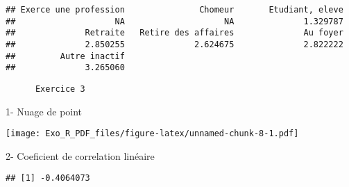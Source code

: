 \documentclass[
]{article}
\newenvironment{Shaded}{\begin{snugshade}}{\end{snugshade}}
\newcommand{\AttributeTok}[1]{\textcolor[rgb]{0.77,0.63,0.00}{#1}}
\newcommand{\CommentTok}[1]{\textcolor[rgb]{0.56,0.35,0.01}{\textit{#1}}}
\newcommand{\FunctionTok}[1]{\textcolor[rgb]{0.00,0.00,0.00}{#1}}
\newcommand{\NormalTok}[1]{#1}
\newcommand{\OtherTok}[1]{\textcolor[rgb]{0.56,0.35,0.01}{#1}}
\newcommand{\SpecialCharTok}[1]{\textcolor[rgb]{0.00,0.00,0.00}{#1}}
\newcommand{\StringTok}[1]{\textcolor[rgb]{0.31,0.60,0.02}{#1}}
\begin{document}
\begin{verbatim}
## Exerce une profession               Chomeur       Etudiant, eleve 
##                    NA                    NA              1.329787 
##              Retraite   Retire des affaires              Au foyer 
##              2.850255              2.624675              2.822222 
##         Autre inactif 
##              3.265060
\end{verbatim}

\begin{verbatim}
      Exercice 3
\end{verbatim}

1- Nuage de point

\begin{Shaded}
\end{Shaded}

\texttt{[image: Exo\_R\_PDF\_files/figure-latex/unnamed-chunk-8-1.pdf]}

2- Coeficient de correlation linéaire

\begin{Shaded}
\end{Shaded}

\begin{verbatim}
## [1] -0.4064073
\end{verbatim}
\end{document}
